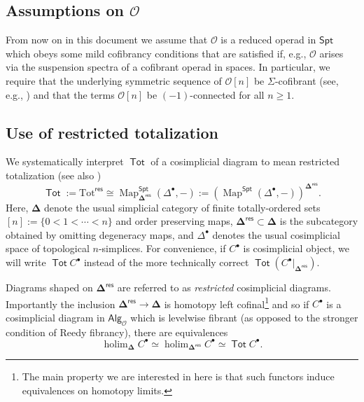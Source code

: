 \documentclass[11pt]{amsart}
\theoremstyle{definition}
\theoremstyle{remark}
\newcommand{\Spt}{\mathsf{Spt}}
\newcommand{\Tot}{\operatorname{\mathsf{Tot}}}
\newcommand{\holim}{\operatorname{holim}}
\newcommand{\Alg}[1]{ {\mathsf{Alg}_{\mathcal{#1}}} }
\newcommand{\Map}{\operatorname{Map}}
\newcommand{\Cal}[1]{\mathcal{#1}}
\newcommand{\bdel}{\mathbf{\Delta}}
\newcommand{\Dres}{\bdel^{\mathsf{res}}}
\begin{document}
\subsection{Assumptions on $\Cal{O}$} \label{cofibrancy} 
From now on in this document we assume that $\Cal{O}$ is a reduced operad in $\Spt$ which obeys some mild cofibrancy conditions that are satisfied if, e.g.,  $\Cal{O}$ arises via the suspension spectra of a cofibrant operad in spaces. In particular, we require that the underlying symmetric sequence of  $\Cal{O}[n]$ be $\Sigma$-cofibrant (see, e.g.,  \cite[]{AC-1}) and that the terms $\Cal{O}[n]$ be $(-1)$-connected for all $n \geq 1$. 



\subsection{Use of restricted totalization} \label{sec:Use-of-tot}
We systematically interpret $\Tot$ of a cosimplicial diagram to mean restricted totalization (see also  \cite[]{Ching-Harper-Koszul}) \[\Tot:=\mathrm{Tot}^{\mathsf{res}}\cong\Map_{\Dres}^{\Spt} \left( \Delta^{\bullet}, -\right):=\left(\Map^{\Spt}(\Delta^{\bullet},-)\right)^{\Dres}.\] Here, $\bdel$ denote the usual simplicial category of finite totally-ordered sets $[n]:=\{0<1< \cdots<n\}$ and order preserving maps, $\Dres\subset \bdel$ is the subcategory obtained by omitting degeneracy maps, and $\Delta^{\bullet}$ denotes the usual cosimplicial space of topological $n$-simplices. For convenience, if  $C^{\bullet}$ is cosimplicial object, we will write $\Tot C^{\bullet}$ instead of the more technically correct $\Tot (C^{\bullet}|_{\Dres})$.

Diagrams shaped on $\Dres$ are referred to as \textit{restricted} cosimplicial diagrams. Importantly the inclusion $\Dres \to \bdel$ is homotopy left cofinal\footnote{The main property we are interested in here is that such functors induce equivalences on homotopy limits.} and so if $C^{\bullet}$ is a cosimplicial diagram in $\Alg{O}$ which is levelwise fibrant (as opposed to the stronger condition of Reedy fibrancy), there are equivalences  \[ \holim_{\bdel} C^{\bullet}\simeq \holim_{\Dres} C^{\bullet}\simeq  \Tot C^{\bullet}.\]
\end{document}
